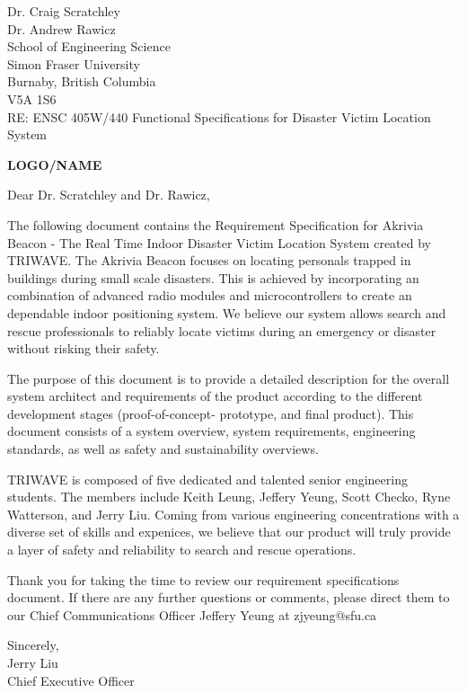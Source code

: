 \documentclass[11pt]{letter}
\date{June 09, 2019}
\begin{document}
\begin{letter}{
Dr. Craig Scratchley\\
Dr. Andrew Rawicz\\
School of Engineering Science\\
Simon Fraser University\\
Burnaby, British Columbia\\
V5A 1S6\\
\bigskip
RE: ENSC 405W/440 Functional Specifications for Disaster Victim Location System\\
} 


\begin{center}
\Huge\bf LOGO/NAME
\bigskip
\end{center} 


\opening{Dear Dr. Scratchley and Dr. Rawicz,} 
 
The following document contains the Requirement Specification for Akrivia Beacon - The Real Time Indoor Disaster Victim Location System created by TRIWAVE. The Akrivia Beacon focuses on locating personals trapped in buildings during small scale disasters. This is achieved by incorporating an combination of advanced radio modules and microcontrollers to create an dependable indoor positioning system. We believe our system allows search and rescue professionals to reliably locate victims during an emergency or disaster without risking their safety.

The purpose of this document is to provide a detailed description for the overall system architect and requirements of the product according to the different development stages (proof-of-concept- prototype, and final product). This document consists of a system overview, system requirements, engineering standards, as well as safety and sustainability overviews.

TRIWAVE is composed of five dedicated and talented senior engineering students. The members include Keith Leung, Jeffery Yeung, Scott Checko, Ryne Watterson, and Jerry Liu. Coming
from various engineering concentrations with a diverse set of skills and expenices, we believe that our product will truly provide a layer of safety and reliability to search and rescue operations.

Thank you for taking the time to review our requirement specifications document. If there are any further questions or comments, please direct them to our Chief Communications Officer Jeffery Yeung at zjyeung@sfu.ca

Sincerely,\\
Jerry Liu\\
Chief Executive Officer\\


\end{letter}
\end{document}
